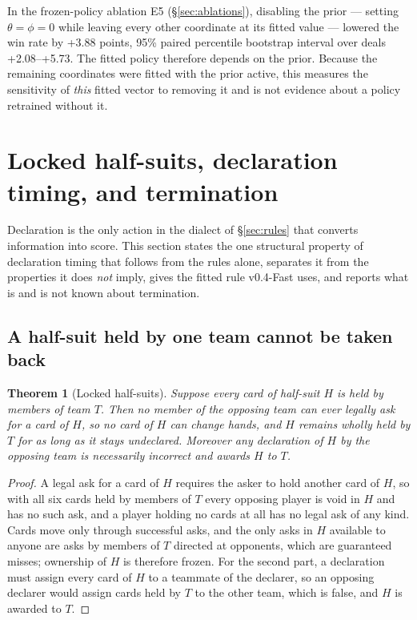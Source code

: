 \documentclass[11pt]{article}
\newtheorem{theorem}{Theorem}
\theoremstyle{definition}
\DeclareRobustCommand{\vfast}{\texorpdfstring{\mbox{v0.4-Fast}}{v0.4-Fast}}
\newcommand{\numAblPrior}{+3.88}
\newcommand{\numAblPriorCI}{+2.08--+5.73}
\begin{document}
In the frozen-policy ablation E5 (\S\ref{sec:ablations}), disabling the prior ---
setting $\theta = \phi = 0$ while leaving every other coordinate at its fitted
value --- lowered the win rate by \numAblPrior{} points, 95\% paired percentile
bootstrap interval over deals \numAblPriorCI{}. The fitted policy therefore
depends on the prior. Because the remaining coordinates were fitted with the
prior active, this measures the sensitivity of \emph{this} fitted vector to
removing it and is not evidence about a policy retrained without it.
\section{Locked half-suits, declaration timing, and termination}
\label{sec:locked}

Declaration is the only action in the dialect of \S\ref{sec:rules} that converts
information into score. This section states the one structural property of
declaration timing that follows from the rules alone, separates it from the
properties it does \emph{not} imply, gives the fitted rule \vfast{} uses, and
reports what is and is not known about termination.

\subsection{A half-suit held by one team cannot be taken back}

\begin{theorem}[Locked half-suits]
\label{thm:locked}
Suppose every card of half-suit $H$ is held by members of team $T$. Then no
member of the opposing team can ever legally ask for a card of $H$, so no card of
$H$ can change hands, and $H$ remains wholly held by $T$ for as long as it stays
undeclared. Moreover any declaration of $H$ by the opposing team is necessarily
incorrect and awards $H$ to $T$.
\end{theorem}

\begin{proof}
A legal ask for a card of $H$ requires the asker to hold another card of $H$, so
with all six cards held by members of $T$ every opposing player is void in $H$
and has no such ask, and a player holding no cards at all has no legal ask of any
kind. Cards move only through successful asks, and the only asks in $H$ available
to anyone are asks by members of $T$ directed at opponents, which are guaranteed
misses; ownership of $H$ is therefore frozen. For the second part, a declaration
must assign every card of $H$ to a teammate of the declarer, so an opposing
declarer would assign cards held by $T$ to the other team, which is false, and
$H$ is awarded to $T$.
\end{proof}
\end{document}
